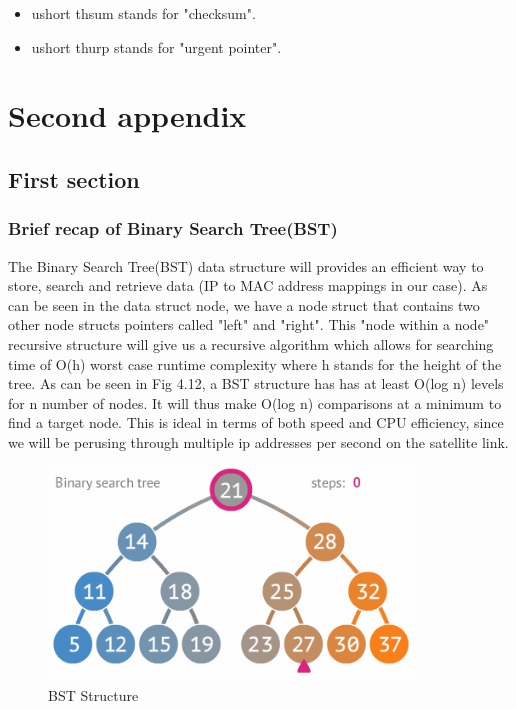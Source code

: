 \documentclass{uathesis}
\begin{document}
\begin{appendices}
\begin{itemize}
\item u\textunderscore short th\textunderscore sum stands for "checksum".

\item u\textunderscore short th\textunderscore urp stands for "urgent pointer".

\end{itemize}

  \chapter{Second appendix}
  \section{First section}
  \subsection*{Brief recap of Binary Search Tree(BST)}
The Binary Search Tree(BST) data structure will provides an efficient way to store, search and retrieve data (IP to MAC address mappings in our case). As can be seen in the data struct node, we have a node struct that contains two other node structs pointers called "left" and "right". This "node within a node" recursive structure will give us a recursive algorithm which allows for searching time of O(h) worst case runtime complexity where h stands for the height of the tree. As can be seen in Fig 4.12, a BST structure has has at least O(log n) levels for n number of nodes. It will thus make O(log n) comparisons at a minimum to find a target node. This is ideal in terms of both speed and CPU efficiency, since we will be perusing through multiple ip addresses per second on the satellite link. 

\begin{figure}[h!]
	\centering
    \includegraphics[width=0.87\textwidth]{BST.PNG}
    \caption{BST Structure}
    \label{fig:BST}
\end{figure}


\end{appendices}
\end{document}

